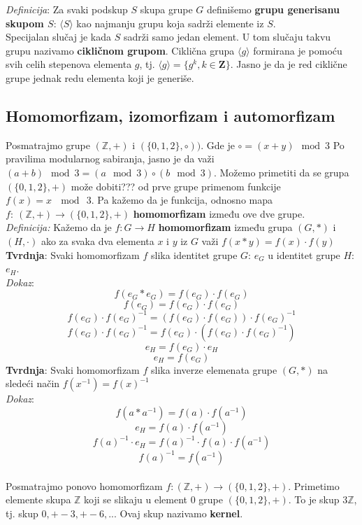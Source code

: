 \documentclass{article}
\begin{document}
\textit{Definicija}: Za svaki podskup $S$ skupa grupe $G$ definišemo \textbf{grupu generisanu skupom $S$}: $\langle S \rangle$ kao najmanju grupu koja sadrži elemente iz $S$.\\

Specijalan slučaj je kada $S$ sadrži samo jedan element. U tom slučaju takvu grupu nazivamo \textbf{cikličnom grupom}. Ciklična grupa $\langle g \rangle$ formirana je pomoću svih celih stepenova elementa $g$, tj. $\langle g \rangle = \{g^k, k \in \mathbf{Z} \}$. Jasno je da je red ciklične grupe jednak redu elementa koji je generiše.

\subsection{Homomorfizam, izomorfizam i automorfizam}
Posmatrajmo grupe $(\mathbb{Z}, +)$ i $(\{0,1,2\}, \circ))$. Gde je $\circ = (x+y) \mod 3$
Po pravilima modularnog sabiranja, jasno je da važi $(a+b) \mod 3 = (a \mod 3) \circ (b \mod 3)$. Možemo primetiti da se grupa $(\{0,1,2\}, +)$ može dobiti??? od prve grupe primenom funkcije $f(x) = x \: \mod \: 3$. Pa kažemo da je funkcija, odnosno mapa $f: \: (\mathbb{Z}, +) \rightarrow (\{0,1,2\}, +)$ \textbf{homomorfizam} između ove dve grupe. \\

\textit{Definicija:} Kažemo da je $f:G \rightarrow H$ \textbf{homomorfizam} između grupa $(G,*)$ i $(H,\cdot)$ ako za svaka dva elementa $x$ i $y$ iz $G$ važi $f(x*y) = f(x) \cdot f(y)$ \\

\textbf{Tvrdnja}: Svaki homomorfizam $f$ slika identitet grupe $G$: $e_G$ u identitet grupe $H$:  $e_H$.\\
\textit{Dokaz}:
$$f(e_G*e_G) = f(e_G) \cdot f(e_G)$$
$$f(e_G) = f(e_G) \cdot f(e_G)$$
$$f(e_G) \cdot f(e_G)^{-1} = (f(e_G)\cdot f(e_G)) \cdot f(e_G)^{-1}$$
$$f(e_G) \cdot f(e_G)^{-1} = f(e_G) \cdot (f(e_G) \cdot f(e_G)^{-1})$$
$$e_H = f(e_G) \cdot e_H$$
$$e_H = f(e_G)$$
\textbf{Tvrdnja}: Svaki homomorfizam $f$ slika inverze elemenata grupe $(G,*)$ na sledeći način $f(x^{-1}) = f(x)^{-1}$\\
\textit{Dokaz}:
$$f(a * a^{-1}) = f(a) \cdot f(a^{-1})$$
$$e_H = f(a) \cdot f(a^{-1})$$
$$f(a)^{-1} \cdot e_H = f(a)^{-1} \cdot f(a) \cdot f(a^{-1})$$
$$f(a)^{-1} = f(a ^{-1})$$\\
Posmatrajmo ponovo homomorfizam $f: (\mathbb{Z}, +) \rightarrow (\{0,1,2\}, +)$. Primetimo elemente skupa $\mathbb{Z}$ koji se slikaju u element $0$ grupe $(\{0,1,2\}, +)$. To je skup $3\mathbb{Z}$, tj. skup ${0,+-3,+-6,..}$. Ovaj skup nazivamo \textbf{kernel}.\\
\end{document}

